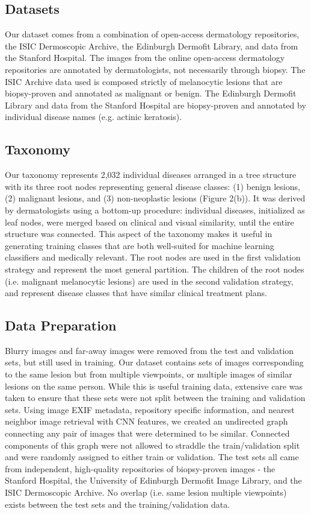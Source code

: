 \subsection{Datasets}
Our dataset comes from a combination of open-access dermatology repositories, the ISIC Dermoscopic Archive, the Edinburgh Dermofit Library, and data from the Stanford Hospital. The images from the online open-access dermatology repositories are annotated by dermatologists, not necessarily through biopsy. The ISIC Archive data used is composed strictly of melanocytic lesions that are biopsy-proven and annotated as malignant or benign. The Edinburgh Dermofit Library and data from the Stanford Hospital are biopsy-proven and annotated by individual disease names (e.g. actinic keratosis). 

\subsection{Taxonomy}
Our taxonomy represents 2,032 individual diseases arranged in a tree structure with its three root nodes representing general disease classes: (1) benign lesions, (2) malignant lesions, and (3) non-neoplastic lesions (Figure 2(b)). It was derived by dermatologists using a bottom-up procedure: individual diseases, initialized as leaf nodes, were merged based on clinical and visual similarity, until the entire structure was connected. This aspect of the taxonomy makes it useful in generating training classes that are both well-suited for machine learning classifiers and medically relevant. The root nodes are used in the first validation strategy and represent the most general partition. The children of the root nodes (i.e. malignant melanocytic lesions) are used in the second validation strategy, and represent disease classes that have similar clinical treatment plans.

\subsection{Data Preparation}
Blurry images and far-away images were removed from the test and validation sets, but still used in training. Our dataset contains sets of images corresponding to the same lesion but from multiple viewpoints, or multiple images of similar lesions on the same person. While this is useful training data, extensive care was taken to ensure that these sets were not split between the training and validation sets. Using image EXIF metadata, repository specific information, and nearest neighbor image retrieval with CNN features, we created an undirected graph connecting any pair of images that were determined to be similar. Connected components of this graph were not allowed to straddle the train/validation split and were randomly assigned to either train or validation. The test sets all came from independent, high-quality repositories of biopsy-proven images - the Stanford Hospital, the University of Edinburgh Dermofit Image Library, and the ISIC Dermoscopic Archive. No overlap (i.e. same lesion multiple viewpoints) exists between the test sets and the training/validation data.

